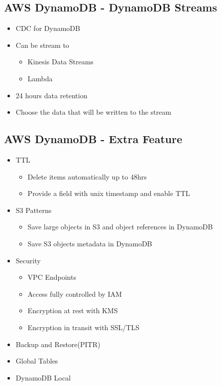 \documentclass[../../main.tex]{subfiles}
\begin{document}
\subsection{AWS DynamoDB - DynamoDB Streams}
\begin{itemize}
    \item CDC for DynamoDB
    \item Can be stream to
    \begin{itemize}
        \item Kinesis Data Streams
        \item Lambda
    \end{itemize}
    \item 24 hours data retention
    \item Choose the data that will be written to the stream
\end{itemize}

\subsection{AWS DynamoDB - Extra Feature}
\begin{itemize}
    \item TTL
    \begin{itemize}
        \item Delete items automatically up to 48hrs
        \item Provide a field with unix timestamp and enable TTL
    \end{itemize}
    \item S3 Patterns
    \begin{itemize}
        \item Save large objects in S3 and object references in DynamoDB
        \item Save S3 objects metadata in DynamoDB
    \end{itemize}
    \item Security
    \begin{itemize}
        \item VPC Endpoints
        \item Access fully controlled by IAM
        \item Encryption at rest with KMS
        \item Encryption in transit with SSL/TLS
    \end{itemize}
    \item Backup and Restore(PITR)
    \item Global Tables
    \item DynamoDB Local
\end{itemize}
\end{document}
